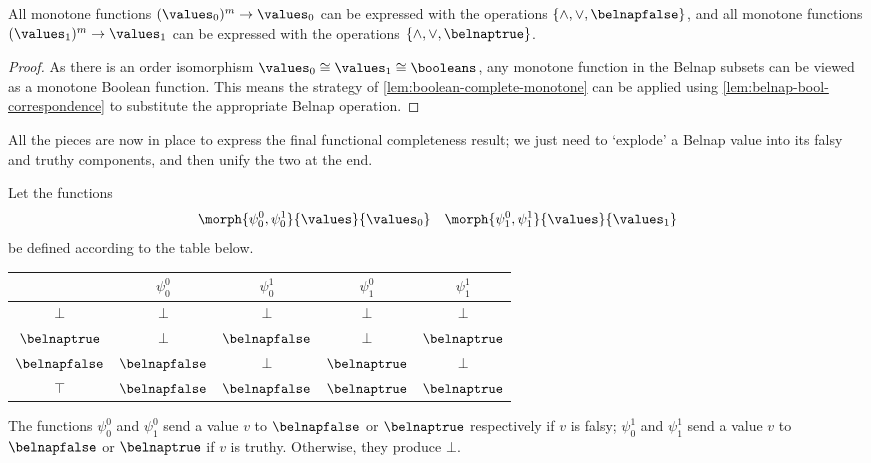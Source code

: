 \begin{corollary}\label{cor:func-complete-falsy-truthy}
    All monotone functions \((\values_0)^m \to \values_0\) can be expressed
    with the operations \(\{\land,\lor,\belnapfalse\}\), and all monotone
    functions \((\values_1)^m \to \values_1\) can be expressed with the
    operations \(\{\land,\lor,\belnaptrue\}\).
\end{corollary}
\begin{proof}
    As there is an order isomorphism
    \(\values_0 \cong \values_1 \cong \booleans\), any monotone function in
    the Belnap subsets can be viewed as a monotone Boolean function.
    This means the strategy of \cref{lem:boolean-complete-monotone} can
    be applied using \cref{lem:belnap-bool-correspondence} to substitute the
    appropriate Belnap operation.
\end{proof}

All the pieces are now in place to express the final functional completeness
result; we just need to `explode' a Belnap value into its falsy and truthy
components, and then unify the two at the end.

\begin{definition}
    \label{def:translation-tables}
    Let the functions \[
        \morph{\psi^0_0,\psi^1_0}{\values}{\values_0}
        \quad
        \morph{\psi^0_1,\psi^1_1}{\values}{\values_1}
    \] be defined according to the table below.
    \begin{center}
        \begin{tabular}{c|cccc}
                             & \(\psi^0_0\)     & \(\psi^1_0\)     & \(\psi^0_1\)    & \(\psi^1_1\)    \\
            \hline
            \(\bot\)         & \(\bot\)         & \(\bot\)         & \(\bot\)        & \(\bot\)        \\
            \(\belnaptrue\)  & \(\bot\)         & \(\belnapfalse\) & \(\bot\)        & \(\belnaptrue\) \\
            \(\belnapfalse\) & \(\belnapfalse\) & \(\bot\)         & \(\belnaptrue\) & \(\bot\)        \\
            \(\top\)         & \(\belnapfalse\) & \(\belnapfalse\) & \(\belnaptrue\) & \(\belnaptrue\) \\
        \end{tabular}
    \end{center}
\end{definition}

The functions \(\psi^0_0\) and \(\psi^0_1\) send a value \(v\) to
\(\belnapfalse\) or \(\belnaptrue\) respectively if \(v\) is falsy;
\(\psi^1_0\) and \(\psi^1_1\) send a value \(v\) to
\(\belnapfalse\) or \(\belnaptrue\) if \(v\) is truthy.
Otherwise, they produce \(\bot\).

